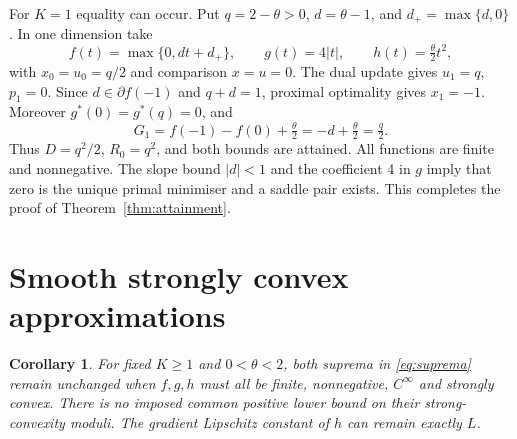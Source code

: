\documentclass[11pt,a4paper]{article}
\newtheorem{corollary}[theorem]{Corollary}
\theoremstyle{remark}\newtheorem{remark}[theorem]{Remark}
\begin{document}
For $K=1$ equality can occur. Put $q=2-\theta>0$, $d=\theta-1$, and $d_+=\max\{d,0\}$. In one dimension take
\[
f(t)=\max\{0,dt+d_+\},\qquad g(t)=4|t|,\qquad h(t)=\tfrac\theta2t^2,
\]
with $x_0=u_0=q/2$ and comparison $x=u=0$. The dual update gives $u_1=q$, $p_1=0$. Since $d\in\partial f(-1)$ and $q+d=1$, proximal optimality gives $x_1=-1$. Moreover $g^*(0)=g^*(q)=0$, and
\[
G_1=f(-1)-f(0)+\tfrac\theta2=-d+\tfrac\theta2=\tfrac q2.
\]
Thus $D=q^2/2$, $R_0=q^2$, and both bounds are attained. All functions are finite and nonnegative. The slope bound $|d|<1$ and the coefficient 4 in $g$ imply that zero is the unique primal minimiser and a saddle pair exists. This completes the proof of Theorem~\ref{thm:attainment}.

\section{Smooth strongly convex approximations}

\begin{corollary}\label{cor:smooth}
For fixed $K\ge1$ and $0<\theta<2$, both suprema in \eqref{eq:suprema} remain unchanged when $f,g,h$ must all be finite, nonnegative, $C^\infty$ and strongly convex. There is no imposed common positive lower bound on their strong-convexity moduli. The gradient Lipschitz constant of $h$ can remain exactly $L$.
\end{corollary}
\end{document}
